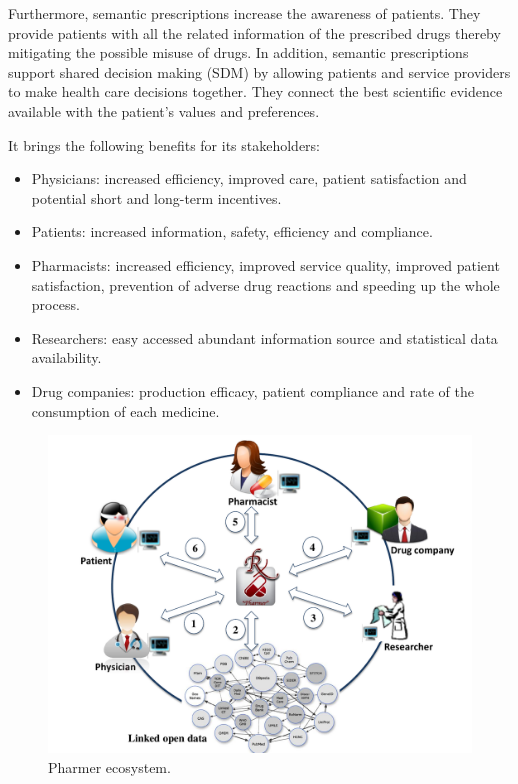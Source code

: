 \documentclass[conference]{IEEEtran}
\begin{document}
Furthermore, semantic prescriptions increase the awareness of patients.
They provide patients with all the related information of the prescribed drugs thereby mitigating the possible misuse of drugs.
In addition, semantic prescriptions support shared decision making (SDM) by allowing patients and service providers to make health care decisions together.
They connect the best scientific evidence available with the patient’s values and preferences.

It brings the following benefits for its stakeholders:
\begin{itemize}
\item Physicians: increased efficiency, improved care, patient satisfaction and potential short and long-term incentives.
\item Patients: increased information, safety, efficiency and compliance.
\item Pharmacists: increased efficiency, improved service quality, improved patient satisfaction,  prevention of adverse drug reactions and speeding up the whole process.
\item Researchers: easy accessed abundant information source and statistical data availability.
\item Drug companies: production efficacy, patient compliance and rate of the consumption of each medicine.
\end{itemize}

\begin{figure}[tb]
	\centering
		\includegraphics[width=1.0\columnwidth]{../images/system.pdf}
	\caption{Pharmer ecosystem.}
	\label{fig:system}
\end{figure}
\end{document}
